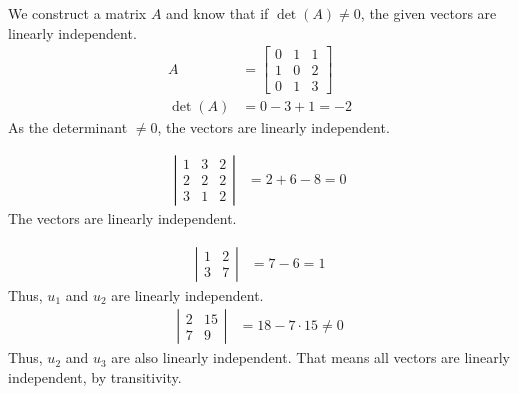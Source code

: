 \documentclass[a4paper,norsk,12pt]{article}
\begin{document}
We construct a matrix $A$ and know that if $\det{(A)} \ne 0$, the given vectors
are linearly independent.
\begin{align*}
  A &=
  \left[
    \begin{array}{ccc}
      0 & 1 & 1 \\
      1 & 0 & 2 \\
      0 & 1 & 3
    \end{array}
  \right] \\
  \det{(A)} &= 0 -3 + 1 = -2
\end{align*}
As the determinant $\ne 0$, the vectors are linearly independent.

\begin{align*}
  \left|
    \begin{array}{ccc}
      1 & 3 & 2 \\
      2 & 2 & 2 \\
      3 & 1 & 2
    \end{array}
  \right|
  &= 2+6-8 = 0
\end{align*}
The vectors are linearly independent.

\begin{align*}
  \left|
    \begin{array}{ccc}
      1 & 2 \\
      3 & 7
    \end{array}
  \right|
  &= 7-6 = 1
\end{align*}
Thus, $u_1$ and $u_2$ are linearly independent.
\begin{align*}
  \left|
    \begin{array}{ccc}
      2 & 15 \\
      7 & 9
    \end{array}
  \right|
  &= 18-7\cdot15 \ne 0
\end{align*}
Thus, $u_2$ and $u_3$ are also linearly independent. That means all vectors are
linearly independent, by transitivity.
\end{document}
